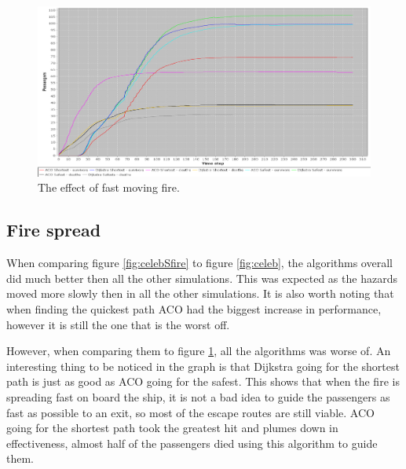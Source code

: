 \begin{figure} [h]
\centering
\hspace*{-1.0in}
\includegraphics[scale=0.35]{images/Graph-using-200-rounds-140-passangers-and-fast-fire.png}
\caption{The effect of fast moving fire.}
\label{fig:celebFfire}
\end{figure}

\subsection{Fire spread}

When comparing figure \ref{fig:celebSfire} to figure \ref{fig:celeb}, the algorithms overall did much better then all the other simulations. This was expected as the hazards moved more slowly then in all the other simulations. It is also worth noting that when finding the quickest path ACO had the biggest increase in performance, however it is still the one that is the worst off.

However, when comparing them to figure \ref{fig:celebFfire}, all the algorithms was worse of. An interesting thing to be noticed in the graph is that Dijkstra going for the shortest path is just as good as ACO going for the safest. This shows that when the fire is spreading fast on board the ship, it is not a bad idea to guide the passengers as fast as possible to an exit, so most of the escape routes are still viable. ACO going for the shortest path took the greatest hit and plumes down in effectiveness, almost half of the passengers died using this algorithm to guide them.




